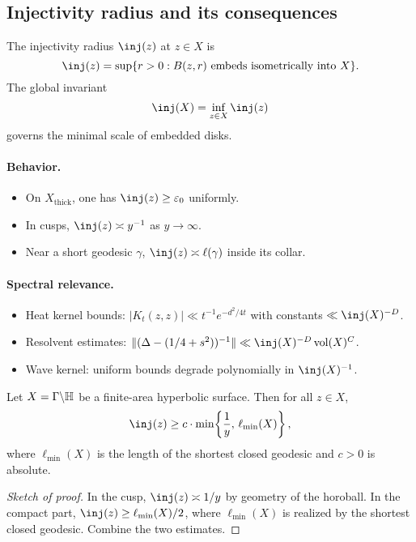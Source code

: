 \subsection{Injectivity radius and its consequences}\label{subsec:injrad}

The injectivity radius $\inj(z)$ at $z\in X$ is
\[
\inj(z) = \sup\{ r>0 : B(z,r)\ \text{embeds isometrically into}\ X \}.
\]
The global invariant
\[
\inj(X) = \inf_{z\in X} \inj(z)
\]
governs the minimal scale of embedded disks.

\paragraph{Behavior.}
\begin{itemize}
  \item On $X_{\mathrm{thick}}$, one has $\inj(z)\ge \varepsilon_0$ uniformly.
  \item In cusps, $\inj(z) \asymp y^{-1}$ as $y\to\infty$.
  \item Near a short geodesic $\gamma$, $\inj(z)\asymp \ell(\gamma)$ inside its collar.
\end{itemize}

\paragraph{Spectral relevance.}
\begin{itemize}
  \item Heat kernel bounds: $|K_t(z,z)| \ll t^{-1} e^{-d^2/4t}$ with constants $\ll \inj(X)^{-D}$.
  \item Resolvent estimates: $\|(\Delta-(1/4+s^2))^{-1}\|\ll \inj(X)^{-D} \vol(X)^C$.
  \item Wave kernel: uniform bounds degrade polynomially in $\inj(X)^{-1}$.
\end{itemize}

\begin{lemma}\label{lem:inj-bound}
Let $X=\Gamma\backslash\mathbb{H}$ be a finite-area hyperbolic surface. Then for all $z\in X$,
\[
\inj(z) \ge c \cdot \min\!\left\{ \frac{1}{y}, \, \ell_{\min}(X) \right\},
\]
where $\ell_{\min}(X)$ is the length of the shortest closed geodesic and $c>0$ is absolute.
\end{lemma}

\begin{proof}[Sketch of proof]
In the cusp, $\inj(z)\asymp 1/y$ by geometry of the horoball. In the compact part, $\inj(z)\ge \ell_{\min}(X)/2$, where $\ell_{\min}(X)$ is realized by the shortest closed geodesic. Combine the two estimates.
\end{proof}

